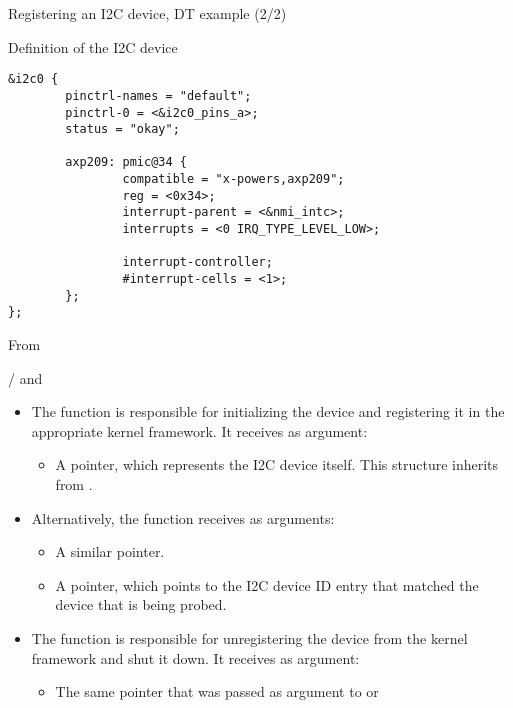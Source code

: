 \begin{frame}[fragile]{Registering an I2C device, DT example (2/2)}
  \begin{block}{Definition of the I2C device}
    \begin{verbatim}
&i2c0 {
        pinctrl-names = "default";
        pinctrl-0 = <&i2c0_pins_a>;
        status = "okay";

        axp209: pmic@34 {
                compatible = "x-powers,axp209";
                reg = <0x34>;
                interrupt-parent = <&nmi_intc>;
                interrupts = <0 IRQ_TYPE_LEVEL_LOW>;

                interrupt-controller;
                #interrupt-cells = <1>;
        };
};
    \end{verbatim}
  \end{block}
  From 
\end{frame}

\begin{frame}{ /  and }
  \begin{itemize}
  \item The  function is responsible for initializing
    the device and registering it in the appropriate kernel
    framework. It receives as argument:
    \begin{itemize}
    \item A  pointer, which represents the I2C
      device itself. This structure inherits from .
    \end{itemize}
  \item Alternatively, the  function receives as arguments:
    \begin{itemize}
    \item A similar  pointer.
    \item A  pointer, which points to the
      I2C device ID entry that matched the device that is being
      probed.
    \end{itemize}
  \item The  function is responsible for
    unregistering the device from the kernel framework and shut it
    down. It receives as argument:
    \begin{itemize}
    \item The same  pointer that was passed as
      argument to  or 
    \end{itemize}
  \end{itemize}
\end{frame}

